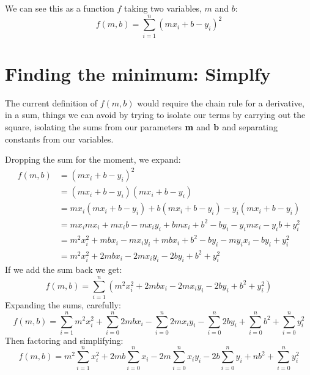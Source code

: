 \documentclass{article}
\begin{document}
We can see this as a function $f$ taking two variables, $m$ and $b$:
\begin{equation}
f(m, b) = \sum_{i=1}^{n}\left(m x_i + b - y_i\right)^2
\end{equation}


\section{Finding the minimum: Simplfy}

The current definition of $f(m, b)$ would require the chain rule for a
derivative, in a sum, things we can avoid by trying to isolate our terms
by carrying out the square, isolating the sums from our parameters ${\bf m}$
and ${\bf b}$ and separating constants from our variables.

Dropping the sum for the moment, we expand:
\begin{equation}
\begin{split}
f(m, b) & = \left(m x_i + b - y_i\right)^2\\
 & = \left(m x_i + b - y_i\right)\left(m x_i + b - y_i\right)\\
 & = m x_i \left(m x_i + b - y_i\right) + b \left(m x_i + b - y_i\right) - y_i \left(m x_i + b - y_i\right) \\
 & = m x_i m x_i + m x_i b - m x_i y_i + b m x_i + b^2 - b y_i - y_i m x_i - y_i b + y_i^2 \\
 & = m^2 x_i^2 + m b x_i  - m x_i y_i + m b x_i + b^2 - b y_i - m y_i x_i - b y_i + y_i^2 \\
 & = m^2 x_i^2 + 2 m b x_i  - 2 m x_i y_i - 2 b y_i + b^2 + y_i^2 
\end{split}
\end{equation}
If we add the sum back we get:
\begin{equation}
f(m, b) = \sum_{i=1}^n \left( m^2 x_i^2 + 2 m b x_i  - 2 m x_i y_i - 2 b y_i + b^2 + y_i^2 \right)
\end{equation}
Expanding the sums, carefully:
\begin{equation}
f(m, b) = \sum_{i=1}^n m^2 x_i^2 + \sum_{i=0}^n 2 m b x_i  - \sum_{i=0}^n 2 m x_i y_i - \sum_{i=0}^n 2 b y_i + \sum_{i=0}^n b^2 + \sum_{i=0}^n y_i^2 
\end{equation}
Then factoring and simplifying:
\begin{equation}
f(m, b) = m^2 \sum_{i=1}^n x_i^2 + 2 m b \sum_{i=0}^n  x_i  - 2 m \sum_{i=0}^n x_i y_i - 2 b \sum_{i=0}^n y_i + n b^2 + \sum_{i=0}^n y_i^2 
\end{equation}
\end{document}
